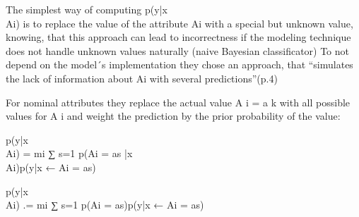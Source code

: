 \par
The simplest way of computing p(y|x\\Ai) is to replace the value of the attribute Ai with a special but unknown value, knowing, that this approach can lead to incorrectness if the modeling technique does not handle unknown values naturally (naive Bayesian classificator)
To not depend on the model´s implementation they chose an approach, that “simulates the lack of information about Ai with several predictions”(p.4)
\par
For  nominal attributes they replace the actual value A i = a k with all possible values for A i and weight the prediction by the prior probability of the value: 
\begin{description}
    \item p(y|x\\Ai) = mi ∑ s=1 p(Ai = as |x\\Ai)p(y|x ← Ai = as) 
    \item p(y|x\\Ai) .= mi ∑ s=1 p(Ai = as)p(y|x ← Ai = as) 
\end{description}

